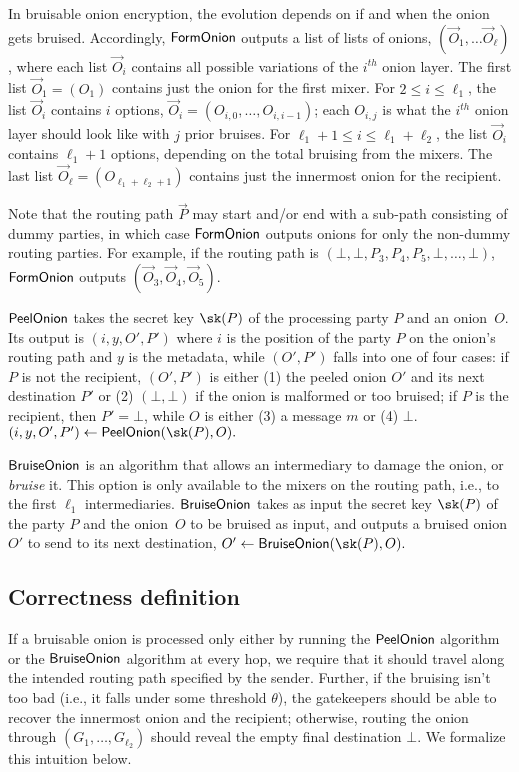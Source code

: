 \begin{description}
\hspace{4mm} In bruisable onion encryption, the evolution depends on if and when the onion gets bruised. Accordingly, $\mathsf{FormOnion}$ outputs a list of lists of onions, $(\vec{O}_1, \dots \vec{O}_{\ell})$, where each list $\vec{O}_i$ contains all possible variations of the $i^\mathit{th}$ onion layer. 
The first list $\vec{O}_1 = (O_1)$ contains just the onion for the first mixer. 
For $2 \le i \le \ell_1$, the list $\vec{O}_i$ contains $i$ options, $\vec{O}_i = (O_{i, 0}, \dots, O_{i, i-1})$; each $O_{i, j}$ is what the $i^\mathit{th}$ onion layer should look like with $j$ prior bruises. 
For $\ell_1 + 1 \le i \le \ell_1 + \ell_2$, the list $\vec{O}_i$ contains $\ell_1+1$ options, depending on the total bruising from the mixers. 
The last list $\vec{O}_{\ell} = (O_{\ell_1+\ell_2+1})$ contains just the innermost onion for the recipient. 

\hspace{4mm} Note that the routing path $\vec{P}$ may start and/or end with a sub-path consisting of dummy parties, in which case $\mathsf{FormOnion}$ outputs onions for only the non-dummy routing parties. For example, if the routing path is $(\bot, \bot, P_3, P_4, P_5, \bot, \dots, \bot)$, $\mathsf{FormOnion}$ outputs $(\vec{O}_3, \vec{O}_4, \vec{O}_5)$. 

\item $\mathsf{PeelOnion}$ takes the secret key $\sk(P)$ of the processing party $P$ and an onion~$O$. Its output is $(i, y, O',P')$ where $i$ is the position of the party $P$ on the onion's routing path and $y$ is the metadata, while $(O',P')$ falls into one of four cases: if $P$ is not the recipient, $(O',P')$ is either 
(1) the peeled onion $O'$ and its next destination $P'$ or (2) $(\bot,\bot)$ if the onion is malformed or too bruised; if $P$ is the recipient, then $P' = \bot$, while $O$ is either (3) a
message $m$ or (4) $\bot$.  
$
(i,y, O', P') \gets \proconion(\sk(P), O).
$

\item $\mathsf{BruiseOnion}$ is an algorithm that allows an intermediary to damage the onion, or \textit{bruise} it.  This option is only available to the mixers on the routing path, i.e., to the first $\ell_1$ intermediaries.  $\mathsf{BruiseOnion}$ takes as input the secret key $\sk(P)$ of the party $P$ and the onion~$O$ to be bruised as input, and outputs a bruised onion $O'$ to send to its next destination, 
$
O' \gets \bruiseonion(\sk(P), O).
$
\end{description}


\subsection{Correctness definition}
If a bruisable onion is processed only either by running the $\mathsf{PeelOnion}$ algorithm or the $\mathsf{BruiseOnion}$ algorithm at every hop, we require that it should travel along the intended routing path specified by the sender. Further, if the bruising isn't too bad (i.e., it falls under some threshold $\theta$), the gatekeepers should be able to recover the innermost onion and the recipient; otherwise, routing the onion through $(G_1, \dots, G_{\ell_2})$ should reveal the empty final destination $\bot$. We formalize this intuition below. 


